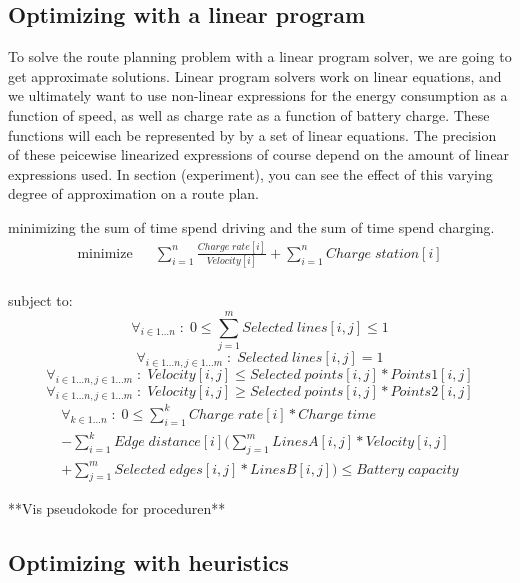\subsection{Optimizing with a linear program} \label{sec:optimizingwithLP}
To solve the route planning problem with a linear program solver, we are going to get approximate solutions. Linear program solvers work on linear equations, and we ultimately want to use non-linear expressions for the energy consumption as a function of speed, as well as charge rate as a function of battery charge. These functions will each be represented by by a set of linear equations. The precision of these peicewise linearized expressions of course depend on the amount of linear expressions used. In section (experiment), you can see the effect of this varying degree of approximation on a route plan.


minimizing the sum of time spend driving and the sum of time spend charging. 
\begin{equation}
\begin{aligned}
{\text{minimize}}
& & \sum_{i=1}^{n} \frac{Charge\;rate[i]}{Velocity[i]} + \sum_{i=1}^{n} Charge\;station[i] \\
\end{aligned}
\end{equation}\label{eq:objfunction}

subject to:
\begin{equation}
\forall_{i\in1 \dots n }\;:\;0\le \sum_{j=1}^{m} Selected\;lines[i,j] \le 1
\end{equation}
\begin{equation}
\forall_{i\in1 \dots n, j \in 1 \dots m} \;:\; Selected\;lines[i,j] = 1
\end{equation}
\begin{equation}
\forall_{i\in1 \dots n, j \in 1 \dots m}\;:\;Velocity[i,j] \le Selected\;points[i,j] * Points1[i,j]
\end{equation}
\begin{equation}
\forall_{i\in1 \dots n, j \in 1 \dots m}\;:\;Velocity[i,j] \ge Selected\;points[i,j] * Points2[i,j]
\end{equation}
\begin{equation}
\begin{split}
\forall_{k\in1 \dots n}\;:\;0 \le\sum_{i=1}^{k}Charge\;rate[i]*Charge\;time\\
-\sum_{i=1}^{k} Edge\; distance[i](\sum_{j=1}^{m} LinesA[i,j]*Velocity[i,j]\\
+\sum_{j=1}^{m} Selected\;edges[i,j]*LinesB[i,j]) \le Battery\;capacity
\end{split}
\end{equation}

**Vis pseudokode for proceduren**

\subsection{Optimizing with heuristics}